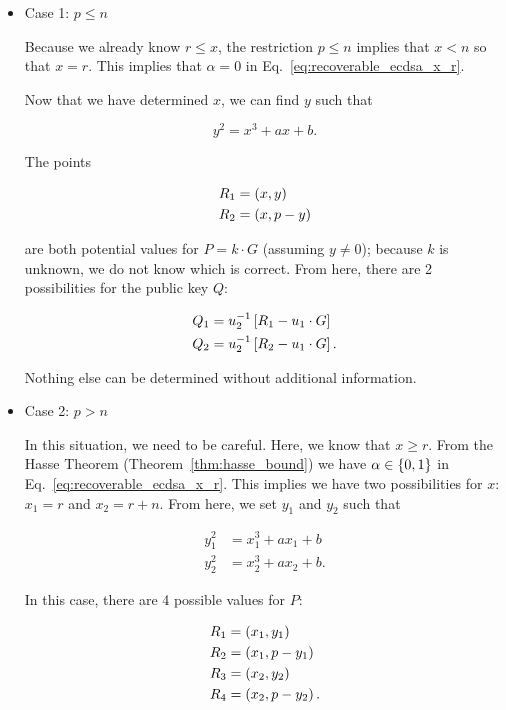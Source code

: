 \begin{itemize}
\item Case 1: $p\le n$

Because we already know $r\le x$, the restriction $p\le n$
implies that $x<n$ so that $x = r$.
This implies that $\alpha=0$ in Eq.~\eqref{eq:recoverable_ecdsa_x_r}.

Now that we have determined $x$, we can find $y$ such that

\begin{equation}
    y^{2} = x^{3} + ax + b.
\end{equation}

\noindent
The points

\begin{align}
    R_{1} &= \left( x,y \right) \nonumber\\
    R_{2} &= \left( x,p-y \right)
\end{align}

\noindent
are both potential values for $P = k\cdot G$ (assuming $y\ne0$);
because $k$ is unknown, we do not know which is correct.
From here, there are 2 possibilities for the public key $Q$:

\begin{align}
    Q_{1} &= u_{2}^{-1}\left[ R_{1} - u_{1}\cdot G \right]
        \nonumber\\
    Q_{2} &= u_{2}^{-1}\left[ R_{2} - u_{1}\cdot G \right].
\end{align}

\noindent
Nothing else can be determined without additional information.

\item Case 2: $p>n$

In this situation, we need to be careful.
Here, we know that $x\ge r$.
From the Hasse Theorem (Theorem~\ref{thm:hasse_bound})
we have $\alpha\in\left\{ 0,1 \right\}$ in Eq.~\eqref{eq:recoverable_ecdsa_x_r}.
This implies we have two possibilities for $x$:
$x_{1} = r$ and $x_{2} = r + n$.
From here, we set $y_{1}$ and $y_{2}$ such that

\begin{align}
    y_{1}^{2} &= x_{1}^{3} + ax_{1} + b
        \nonumber\\
    y_{2}^{2} &= x_{2}^{3} + ax_{2} + b.
\end{align}

\noindent
In this case, there are 4 possible values for $P$:

\begin{align}
    R_{1} &= \left( x_{1},y_{1} \right) \nonumber\\
    R_{2} &= \left( x_{1},p-y_{1} \right) \nonumber\\
    R_{3} &= \left( x_{2},y_{2} \right) \nonumber\\
    R_{4} &= \left( x_{2},p-y_{2} \right).
\end{align}


\end{itemize}

